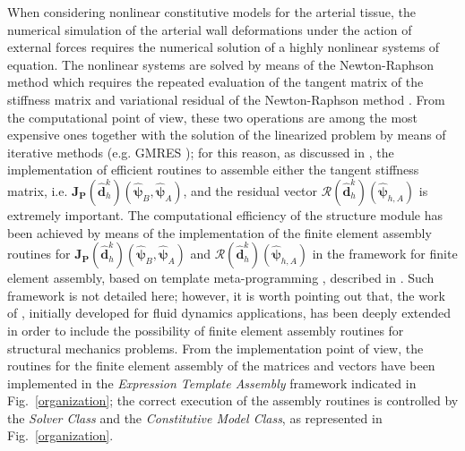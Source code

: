 \documentclass[a4paper, 10pt,twoside]{article}
\theoremstyle{plain}
\theoremstyle{definition}
\theoremstyle{remark}
\newcommand{\Piola}{\textbf{P}}
\newcommand{\Eqref}[1]{Eq.~\eqref{#1}}
\newcommand{\secref}[1]{Sec.~\ref{#1}}
\newcommand{\figRef}[1]{Fig.~\ref{#1}}
\newcommand{\disM}{\widehat{\boldsymbol{d}}}
\newcommand{\testVE}{\widehat{\boldsymbol{\psi}}}
\begin{document}
When considering nonlinear constitutive models for the arterial tissue, the numerical simulation of the arterial wall deformations under the action of external forces requires the numerical solution of a highly nonlinear systems of equation. The nonlinear systems are solved by means of the Newton-Raphson method which requires the repeated evaluation of the tangent matrix of the stiffness matrix and variational residual of the Newton-Raphson method \cite{thesis::Tricerri}. From the computational point of view, these two operations are among the most expensive ones together with the solution of the linearized problem by means of iterative methods (e.g. GMRES \cite{paper::Saad}); for this reason, as discussed in \cite{thesis::Quinodoz,thesis::Andreas}, the implementation of efficient routines to assemble either the tangent stiffness matrix, i.e. $\mathcal{\boldsymbol{J}}_{\Piola}\left( \disM_h^k \right)\left(\testVE_B,\testVE_A\right)$, and the residual vector $\mathcal{R}\left( \disM_h^k \right)\left( \testVE_{h,A}\right)$ is extremely important. The computational efficiency of the structure module has been achieved by means of the implementation of the finite element assembly routines for $\mathcal{\boldsymbol{J}}_{\Piola}\left( \disM_h^k \right)\left(\testVE_B,\testVE_A\right)$ and $\mathcal{R}\left( \disM_h^k \right)\left( \testVE_{h,A}\right)$ in the framework for finite element assembly, based on template meta-programming \cite{paper::Veneziani}, described in \cite{thesis::Quinodoz}. Such framework is not detailed here; however, it is worth pointing out that, the work of \cite{thesis::Quinodoz}, initially developed for fluid dynamics applications, has been deeply extended in order to include the possibility of finite element assembly routines for structural mechanics problems. From the implementation point of view, the routines for the finite element assembly of the matrices and vectors have been implemented in the \textit{Expression Template Assembly} framework indicated in \figRef{organization}; the correct execution of the assembly routines is controlled by the \textit{Solver Class} and the \textit{Constitutive Model Class}, as represented in \figRef{organization}. %
\end{document}
